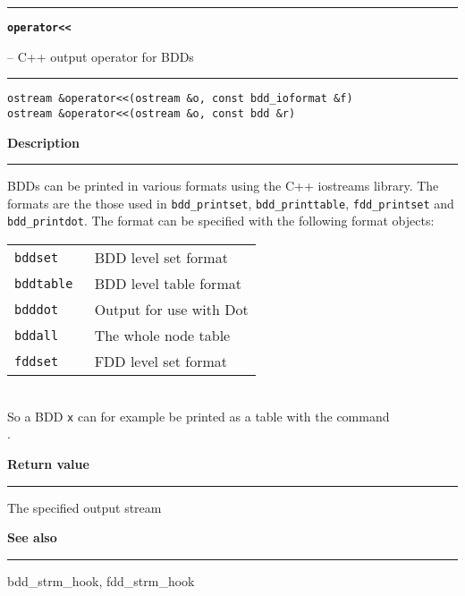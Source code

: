 \begin{minipage}{\textwidth}

\noindent\begin{minipage}{\textwidth}
\rule{\textwidth}{0.5mm}
{\tt\bf operator{\tt<<} }
\--- C++ output operator for BDDs  \hspace{\fill}
\\\rule[1.5ex]{\textwidth}{0.5mm}
\end{minipage}

\noindent\begin{verbatim}
ostream &operator<<(ostream &o, const bdd_ioformat &f)
ostream &operator<<(ostream &o, const bdd &r) 
\end{verbatim}

\vspace{\parsep}\noindent
{\bf Description}\\\rule[1.5ex]{\textwidth}{0.2mm}\vspace{-1.5ex}\setlength{\parindent}{1em}
BDDs can be printed in various formats using the C++ iostreams
           library. The formats are the those used in {\tt bdd\_printset},
	   {\tt bdd\_printtable}, {\tt fdd\_printset} and {\tt bdd\_printdot}.
	   The format can be specified with the following format objects:
	   \begin{tabular}{ll}\\
	     {\tt bddset } & BDD level set format \\
	     {\tt bddtable } & BDD level table format \\
	     {\tt bdddot }   & Output for use with Dot \\
	     {\tt bddall }   & The whole node table \\
	     {\tt fddset }   & FDD level set format \\
	   \end{tabular}\\

	   \noindent
	   So a BDD {\tt x} can for example be printed as a table with the
	   command\\

	   .
	   

\setlength{\parindent}{0em}\vspace{\parsep}\vspace{\baselineskip}\noindent
{\bf Return value}\\\rule[1.5ex]{\textwidth}{0.2mm}\vspace{-1.5ex}
The specified output stream 

\vspace{\parsep}\vspace{\baselineskip}\noindent
{\bf See also}\\\rule[1.5ex]{\textwidth}{0.2mm}\vspace{-1.5ex}
bdd\_strm\_hook, fdd\_strm\_hook 
\end{minipage}
\vspace{8ex}
